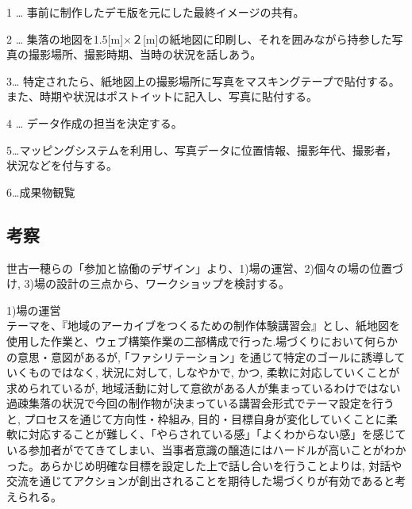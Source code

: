 \documentclass[a4paper]{jsarticle}
\begin{document}
\item 1 … 事前に制作したデモ版を元にした最終イメージの共有。
\item 2 … 集落の地図を1.5[m]×２[m]の紙地図に印刷し、それを囲みながら持参した写真の撮影場所、撮影時期、当時の状況を話しあう。


\item 3… 特定されたら、紙地図上の撮影場所に写真をマスキングテープで貼付する。また、時期や状況はポストイットに記入し、写真に貼付する。

\item 4 … データ作成の担当を決定する。

\item 5…マッピングシステムを利用し、写真データに位置情報、撮影年代、撮影者，状況などを付与する。
\item 6…成果物観覧
\subsection{考察}
世古一穂らの「参加と協働のデザイン」より、1)場の運営、2)個々の場の位置づけ, 3)場の設計の三点から、ワークショップを検討する。\\
\item 1)場の運営\\
テーマを、『地域のアーカイブをつくるための制作体験講習会』とし、紙地図を使用した作業と、ウェブ構築作業の二部構成で行った.場づくりにおいて何らかの意思・意図があるが, ｢ファシリテーション｣ を通じて特定のゴールに誘導していくものではなく, 状況に対して, しなやかで, かつ, 柔軟に対応していくことが求められているが, 地域活動に対して意欲がある人が集まっているわけではない過疎集落の状況で今回の制作物が決まっている講習会形式でテーマ設定を行うと,  プロセスを通じて方向性・枠組み, 目的・目標自身が変化していくことに柔軟に対応することが難しく、「やらされている感」「よくわからない感」を感じている参加者がでてきてしまい、当事者意識の醸造にはハードルが高いことがわかった。あらかじめ明確な目標を設定した上で話し合いを行うことよりは, 対話や交流を通じてアクションが創出されることを期待した場づくりが有効であると考えられる。\\
\end{document}
